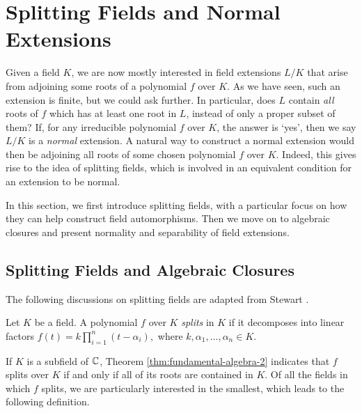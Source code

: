 \section{Splitting Fields and Normal Extensions} \label{sec:normal}

Given a field $K$, we are now mostly interested in field extensions $L/K$ that arise from adjoining some roots of a polynomial $f$ over $K$. As we have seen, such an extension is finite, but we could ask further. In particular, does $L$ contain \textit{all} roots of $f$ which has at least one root in $L$, instead of only a proper subset of them? If,  for any irreducible polynomial $f$ over $K$, the answer is `yes', then we say $L/K$ is a \textit{normal} extension. 
A natural way to construct a normal extension would then be adjoining all roots of some chosen polynomial $f$ over $K$. Indeed, this gives rise to the idea of splitting fields, which is involved in an equivalent condition for an extension to be normal. 

In this section, we first introduce splitting fields, with a particular focus on how they can help construct field automorphisms. Then we move on to algebraic closures and present normality and separability of field extensions. 



\subsection{Splitting Fields and Algebraic Closures}

The following discussions on splitting fields are adapted from Stewart \cite[Chapter~9]{Stewart}. 
\begin{definition}
    Let $K$ be a field. A polynomial $f$ over $K$ \textit{splits} in $K$ if it decomposes into linear factors $
    f(t) = k \prod _{i=1} ^n (t - \alpha_i),
    $
    where $k, \alpha_1, \ldots, \alpha_n \in K$. 
\end{definition}
If $K$ is a subfield of $\mathbb C$, Theorem \ref{thm:fundamental-algebra-2} indicates that $f$ splits over $K$ if and only if all of its roots are contained in $K$. 
Of all the fields in which $f$ splits, we are particularly interested in the smallest, which leads to the following definition.

